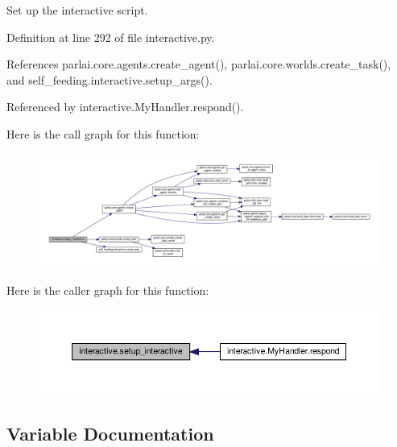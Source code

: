 \begin{DoxyVerb}Set up the interactive script.\end{DoxyVerb}
 

Definition at line 292 of file interactive.\+py.



References parlai.\+core.\+agents.\+create\+\_\+agent(), parlai.\+core.\+worlds.\+create\+\_\+task(), and self\+\_\+feeding.\+interactive.\+setup\+\_\+args().



Referenced by interactive.\+My\+Handler.\+respond().

Here is the call graph for this function\+:
\nopagebreak
\begin{figure}[H]
\begin{center}
\leavevmode
\includegraphics[width=350pt]{namespaceinteractive_a14d7f7e00e2fd76924efb506379c5c30_cgraph}
\end{center}
\end{figure}
Here is the caller graph for this function\+:
\nopagebreak
\begin{figure}[H]
\begin{center}
\leavevmode
\includegraphics[width=350pt]{namespaceinteractive_a14d7f7e00e2fd76924efb506379c5c30_icgraph}
\end{center}
\end{figure}


\subsection{Variable Documentation}
\mbox{\label{namespaceinteractive_a48211e6ceacecf473b131232efbb161a}} 
